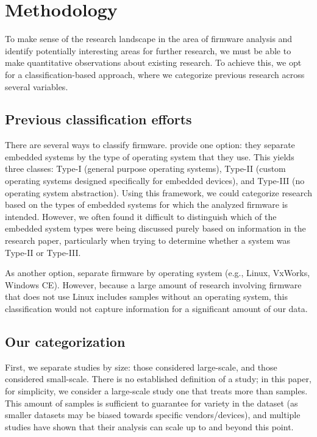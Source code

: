 \section{Methodology}\label{sec:methodology}
To make sense of the research landscape in the area of firmware analysis and identify potentially interesting areas for further research, we must be able to make quantitative observations about existing research.
To achieve this, we opt for a classification-based approach, where we categorize previous research across several variables.

\subsection{Previous classification efforts}\label{ssec:previous classification efforts}
There are several ways to classify firmware.
 provide one option: they separate embedded systems by the type of operating system that they use.
This yields three classes: Type-I (general purpose operating systems), Type-II (custom operating systems designed specifically for embedded devices), and Type-III (no operating system abstraction).
Using this framework, we could categorize research based on the types of embedded systems for which the analyzed firmware is intended.
However, we often found it difficult to distinguish which of the embedded system types were being discussed purely based on information in the research paper, particularly when trying to determine whether a system was Type-II or Type-III.

As another option,  separate firmware by operating system (e.g., Linux, VxWorks, Windows CE).
However, because a large amount of research involving firmware that does not use Linux includes samples without an operating system, this classification would not capture information for a significant amount of our data.

\subsection{Our categorization}\label{ssec:our categorization}
First, we separate studies by size: those considered large-scale, and those considered small-scale.
There is no established definition of a  study; in this paper, for simplicity, we consider a large-scale study one that treats more than  samples.
This amount of samples is sufficient to guarantee for variety in the dataset (as smaller datasets may be biased towards specific vendors/devices), and multiple studies have shown that their analysis can scale up to and beyond this point.

